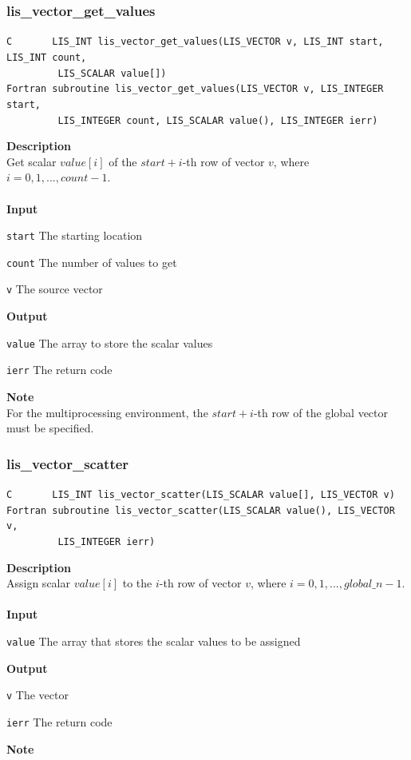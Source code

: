 \documentclass[a4paper]{article}
\newcommand{\namelistlabel}[1]{\mbox{#1}\hfill}
\newenvironment{namelist}[1]{%
\begin{list}{}
  {\let\makelabel\namelistlabel
  \settowidth{\labelwidth}{#1}
  \setlength{\leftmargin}{1.1\labelwidth}}
  }{%
\end{list}}
\begin{document}
\subsubsection{lis\_vector\_get\_values}
\begin{screen}
\verb|C       LIS_INT lis_vector_get_values(LIS_VECTOR v, LIS_INT start, LIS_INT count,|\\
\verb|         LIS_SCALAR value[])|\\
\verb|Fortran subroutine lis_vector_get_values(LIS_VECTOR v, LIS_INTEGER start,|\\
\verb|         LIS_INTEGER count, LIS_SCALAR value(), LIS_INTEGER ierr)|
\end{screen}
{\bf Description}\\
\indent
Get scalar $value[i]$ of the $start+i$-th row of vector $v$, 
where $i=0,1,...,count-1$.
\\ \\
\noindent
{\bf Input}
\begin{namelist}{XXXXXXXXXXXXXXXXXXXX}
\item[\tt start] The starting location 
\item[\tt count] The number of values to get
\item[\tt v] The source vector
\end{namelist}
{\bf Output}
\begin{namelist}{XXXXXXXXXXXXXXXXXXXX}
\item[\tt value] The array to store the scalar values
\item[\tt ierr] The return code
\end{namelist}
{\bf Note}\\
\indent
For the multiprocessing environment, the $start+i$-th row of the global vector
must be specified.

\subsubsection{lis\_vector\_scatter}
\begin{screen}
\verb|C       LIS_INT lis_vector_scatter(LIS_SCALAR value[], LIS_VECTOR v)|\\
\verb|Fortran subroutine lis_vector_scatter(LIS_SCALAR value(), LIS_VECTOR v,|\\
\verb|         LIS_INTEGER ierr)|
\end{screen}
{\bf Description}\\
\indent
Assign scalar $value[i]$ to the $i$-th row of vector $v$, 
where $i=0,1,..., global\_n-1$.
\\ \\
\noindent
{\bf Input}
\begin{namelist}{XXXXXXXXXXXXXXXXXXXX}
\item[\tt value] The array that stores the scalar values to be assigned
\end{namelist}
{\bf Output}
\begin{namelist}{XXXXXXXXXXXXXXXXXXXX}
\item[\tt v] The vector
\item[\tt ierr] The return code
\end{namelist}
{\bf Note}\\
\indent
\end{document}
